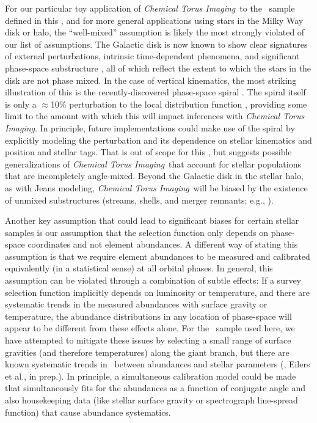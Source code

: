\documentclass[modern]{aastex63}
\newcommand{\methodname}{\textsl{Chemical Torus Imaging}}
\newcommand{\apogee}{\acronym{APOGEE}}
\begin{document}
For our particular toy application of \methodname\ to the \apogee\ sample
defined in this \documentname, and for more general applications using stars in
the Milky Way disk or halo, the ``well-mixed'' assumption is likely the most
strongly violated of our list of assumptions.
The Galactic disk is now known to show clear signatures of external
perturbations, intrinsic time-dependent phenomena, and significant phase-space
substructure \citep[e.g.,][]{Antoja:2018, Schonrich:2018, Hunt:2018,
Kamdar:2019, Monari:2019, Khanna:2019, Poggio:2020, Laporte:2020}, all of which
reflect the extent to which the stars in the disk are not phase mixed.
In the case of vertical kinematics, the most striking illustration of this is
the recently-discovered phase-space spiral \citep{Antoja:2018}.
The spiral itself is only a $\approx$10\% perturbation to the local distribution
function \citep{Laporte:2019}, providing some limit to the amount with which
this will impact inferences with \methodname.
In principle, future implementations could make use of the spiral by explicitly
modeling the perturbation and its dependence on stellar kinematics and position
and stellar tags.
That is out of scope for this \documentname, but suggests possible
generalizations of \methodname\ that account for stellar populations that are
incompletely angle-mixed.
Beyond the Galactic disk in the stellar halo, as with Jeans modeling,
\methodname\ will be biased by the existence of unmixed substructures (streams,
shells, and merger remnants; e.g., \citealt{TODO}).

Another key assumption that could lead to significant biases for certain stellar
samples is our assumption that the selection function only depends on
phase-space coordinates and not element abundances.
A different way of stating this assumption is that we require element abundances
to be measured and calibrated equivalently (in a statistical sense) at all
orbital phases.
In general, this assumption can be violated through a combination of subtle
effects: If a survey selection function implicitly depends on luminosity or
temperature, and there are systematic trends in the measured abundances with
surface gravity or temperature, the abundance distributions in any location of
phase-space will appear to be different from these effects alone.
For the \apogee\ sample used here, we have attempted to mitigate these issues by
selecting a small range of surface gravities (and therefore temperatures) along
the giant branch, but there are known systematic trends in \apogee\ between
abundances and stellar parameters (\citealt{Wheeler:2020}, Eilers et al., in
prep.).
In principle, a simultaneous calibration model could be made that simultaneously
fits for the abundances as a function of conjugate angle and also housekeeping
data (like stellar surface gravity or spectrograph line-spread function) that
cause abundance systematics.
\end{document}
